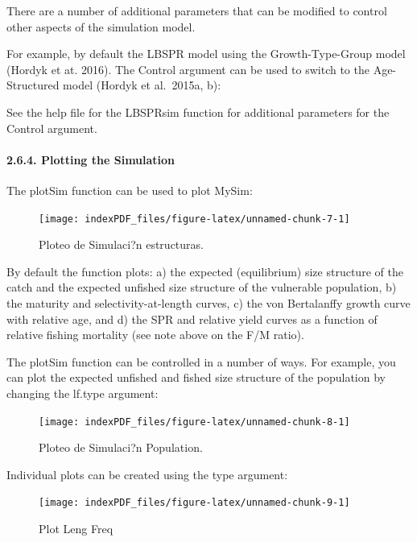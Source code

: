 \documentclass[
]{article}
\begin{document}
There are a number of additional parameters that can be modified to
control other aspects of the simulation model.

For example, by default the LBSPR model using the Growth-Type-Group
model (Hordyk et at. 2016). The Control argument can be used to switch
to the Age-Structured model (Hordyk et al.~2015a, b):

See the help file for the LBSPRsim function for additional parameters
for the Control argument.

\hypertarget{plotting-the-simulation}{%
\paragraph{2.6.4. Plotting the
Simulation}\label{plotting-the-simulation}}

The plotSim function can be used to plot MySim:

\begin{figure}

{\centering \texttt{[image: indexPDF\_files/figure-latex/unnamed-chunk-7-1]} 

}

\caption{Ploteo de Simulaci?n estructuras.}\label{fig:unnamed-chunk-7}
\end{figure}

By default the function plots: a) the expected (equilibrium) size
structure of the catch and the expected unfished size structure of the
vulnerable population, b) the maturity and selectivity-at-length curves,
c) the von Bertalanffy growth curve with relative age, and d) the SPR
and relative yield curves as a function of relative fishing mortality
(see note above on the F/M ratio).

The plotSim function can be controlled in a number of ways. For example,
you can plot the expected unfished and fished size structure of the
population by changing the lf.type argument:

\begin{figure}

{\centering \texttt{[image: indexPDF\_files/figure-latex/unnamed-chunk-8-1]} 

}

\caption{Ploteo de Simulaci?n Population.}\label{fig:unnamed-chunk-8}
\end{figure}

Individual plots can be created using the type argument:

\begin{figure}

{\centering \texttt{[image: indexPDF\_files/figure-latex/unnamed-chunk-9-1]} 

}

\caption{Plot Leng Freq}\label{fig:unnamed-chunk-9}
\end{figure}
\end{document}
